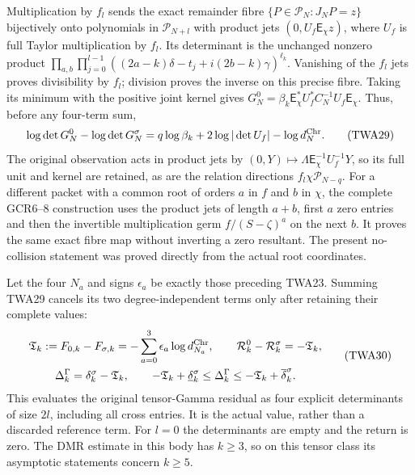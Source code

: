Multiplication by $f_l$ sends the exact remainder fibre
$\{P\in\mathcal P_N:J_NP=z\}$ bijectively onto polynomials
in $\mathcal P_{N+l}$ with product jets
$(0,U_f\mathsf E_\chi z)$, where $U_f$ is full Taylor
multiplication by $f_l$. Its determinant is the unchanged
nonzero product
$\prod_{a,b}\prod_{j=0}^{l-1}
((2a-k)\delta-t_j+i(2b-k)\gamma)^{\ell_k}$.
Vanishing of the $f_l$ jets proves divisibility by $f_l$;
division proves the inverse on this precise fibre.
Taking its minimum with the positive joint kernel gives
$G_N^0=\beta_k\mathsf E_\chi^*U_f^*C_N^{-1}U_f\mathsf E_\chi$.
Thus, before any four-term sum,
\[
 \log\det G_N^0-\log\det G_N^\sigma
      =q\log\beta_k+2\log|\det U_f|-\log d_N^{\rm Chr}.
 \tag{TWA29}
\]
The original observation acts in product jets by
$(0,Y)\mapsto\Lambda\mathsf E_\chi^{-1}U_f^{-1}Y$,
so its full unit and kernel are retained, as are the
relation directions $f_l\chi\mathcal P_{N-q}$.
For a different packet with a common root of orders
$a$ in $f$ and $b$ in $\chi$, the complete GCR6--8
construction uses the product jets of length $a+b$,
first $a$ zero entries and then the invertible
multiplication germ $f/(S-\zeta)^a$ on the next $b$.
It proves the same exact fibre map without inverting
a zero resultant. The present no-collision statement
was proved directly from the actual root coordinates.

Let the four $N_a$ and signs $\epsilon_a$ be exactly those
preceding TWA23. Summing TWA29 cancels its two degree-independent
terms only after retaining their complete values:
\[
\begin{gathered}
 \mathfrak T_k:=F_{0,k}-F_{\sigma,k}
       =-\sum_{a=0}^3\epsilon_a\log d_{N_a}^{\rm Chr},
 \qquad \mathcal R_k^0-\mathcal R_k^\sigma=-\mathfrak T_k,\\
 \Delta_k^\Gamma=\delta_k^\sigma-\mathfrak T_k,\qquad
 -\mathfrak T_k+\underline\delta_k^\sigma
       \leq\Delta_k^\Gamma
       \leq-\mathfrak T_k+\overline\delta_k^\sigma .
\end{gathered}\tag{TWA30}
\]
This evaluates the original tensor-Gamma residual as four
explicit determinants of size $2l$, including all cross entries.
It is the actual value, rather than a discarded reference term.
For $l=0$ the determinants are empty and the return is zero.
The DMR estimate in this body has $k\geq3$, so on this tensor
class its asymptotic statements concern $k\geq5$.

